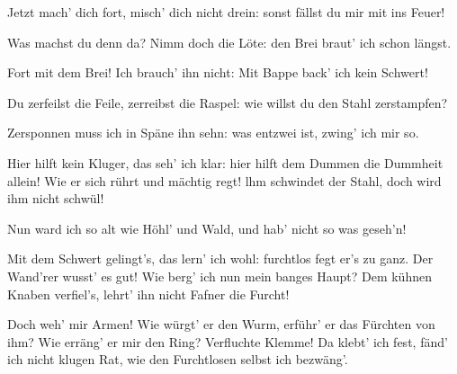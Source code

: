 \begin{drama}
Jetzt mach' dich fort,
misch' dich nicht drein:
sonst fällst du mir mit ins Feuer!


\Mimespeaks


Was machst du denn da?
Nimm doch die Löte:
den Brei braut' ich schon längst.

\Siegfriedspeaks

Fort mit dem Brei!
Ich brauch' ihn nicht:
Mit Bappe back' ich kein Schwert!

\Mimespeaks

Du zerfeilst die Feile,
zerreibst die Raspel:
wie willst du den Stahl zerstampfen?

\Siegfriedspeaks

Zersponnen muss ich
in Späne ihn sehn:
was entzwei ist, zwing' ich mir so.


\Mimespeaks


Hier hilft kein Kluger,
das seh' ich klar:
hier hilft dem Dummen
die Dummheit allein!
Wie er sich rührt
und mächtig regt!
lhm schwindet der Stahl,
doch wird ihm nicht schwül!


Nun ward ich so alt
wie Höhl' und Wald,
und hab' nicht so was geseh'n!


Mit dem Schwert gelingt's,
das lern' ich wohl:
furchtlos fegt er's zu ganz.
Der Wand'rer wusst' es gut!
Wie berg' ich nun
mein banges Haupt?
Dem kühnen Knaben verfiel's,
lehrt' ihn nicht Fafner die Furcht!


Doch weh' mir Armen!
Wie würgt' er den Wurm,
erführ' er das Fürchten von ihm?
Wie erräng' er mir den Ring?
Verfluchte Klemme!
Da klebt' ich fest,
fänd' ich nicht klugen Rat,
wie den Furchtlosen selbst ich bezwäng'.

\Siegfriedspeaks


\end{drama}
